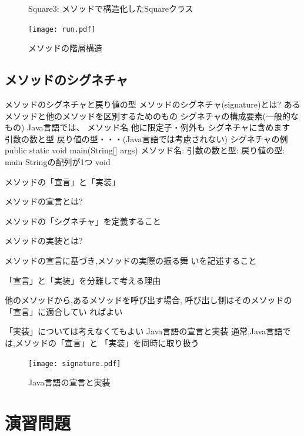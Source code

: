 \documentclass[a4j, twoside]{jsbook}
\begin{document}
\begin{figure}
 
 \caption{Square3: メソッドで構造化したSquareクラス}\label{fig:Square3:Square}
\end{figure}

\begin{figure}
 \begin{center}
  \texttt{[image: run.pdf]}
  \caption{メソッドの階層構造}
 \end{center}
\end{figure}

\subsection{メソッドのシグネチャ}

メソッドのシグネチャと戻り値の型
メソッドのシグネチャ(signature)とは?
 あるメソッドと他のメソッドを区別するためのもの
シグネチャの構成要素(一般的なもの)
Java言語では、
 メソッド名
他に限定子・例外も
シグネチャに含めます
 引数の数と型
 戻り値の型・・・(Java言語では考慮されない)
シグネチャの例
 public static void main(String[] args)
 メソッド名:
 引数の数と型:
 戻り値の型:
main
Stringの配列が1つ
void

メソッドの「宣言」と「実装」

メソッドの宣言とは?

 メソッドの「シグネチャ」を定義すること

メソッドの実装とは?

 メソッドの宣言に基づき,メソッドの実際の振る舞
いを記述すること

「宣言」と「実装」を分離して考える理由

 他のメソッドから,あるメソッドを呼び出す場合,
呼び出し側はそのメソッドの「宣言」に適合してい
ればよい

 「実装」については考えなくてもよい
Java言語の宣言と実装
通常,Java言語では,メソッドの「宣言」と
「実装」を同時に取り扱う

\begin{figure}
 \begin{center}
  \texttt{[image: signature.pdf]}
  \caption{Java言語の宣言と実装}
 \end{center}
\end{figure}

\newpage
\section{演習問題}
\end{document}

